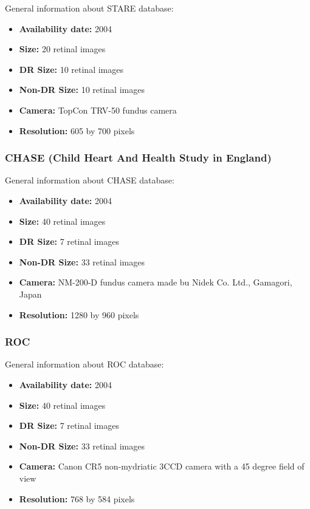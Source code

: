 General information about STARE database:

\begin{itemize}
    \item \textbf{Availability date: } 2004
    \item \textbf{Size: } 20 retinal images
    \item \textbf{DR Size: } 10 retinal images
    \item \textbf{Non-DR Size: } 10 retinal images
    \item \textbf{Camera: } TopCon TRV-50 fundus camera
    \item \textbf{Resolution: } 605 by 700 pixels
\end{itemize}

\subsubsection{CHASE (Child Heart And Health Study in England)}


General information about CHASE database:
\begin{itemize}
    \item \textbf{Availability date: } 2004
    \item \textbf{Size: } 40 retinal images
    \item \textbf{DR Size: } 7 retinal images
    \item \textbf{Non-DR Size: } 33 retinal images
    \item \textbf{Camera: } NM-200-D fundus camera made bu Nidek Co. Ltd., Gamagori, Japan
    \item \textbf{Resolution: } 1280 by 960 pixels
\end{itemize}

\subsubsection{ROC}
General information about ROC database:
\begin{itemize}
    \item \textbf{Availability date: } 2004
    \item \textbf{Size: } 40 retinal images
    \item \textbf{DR Size: } 7 retinal images
    \item \textbf{Non-DR Size: } 33 retinal images
    \item \textbf{Camera: } Canon CR5 non-mydriatic 3CCD camera with a 45 degree field of view
    \item \textbf{Resolution: } 768 by 584 pixels
\end{itemize}

